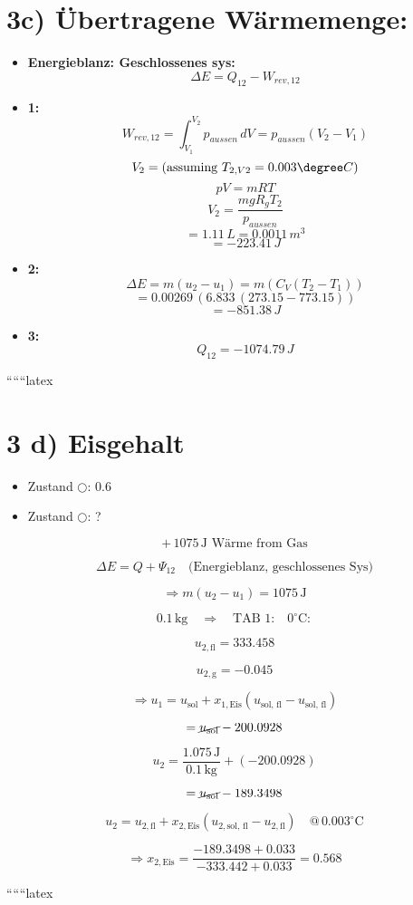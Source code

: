 \section*{3c) Übertragene Wärmemenge:}

\begin{itemize}
    \item \textbf{Energieblanz: Geschlossenes sys:}
    \[
    \Delta E = Q_{12} - W_{rev, 12}
    \]
    \item \textbf{1:}
    \[
    W_{rev, 12} = \int_{V_1}^{V_2} p_{aussen} \, dV = p_{aussen} (V_2 - V_1)
    \]
    \[
    V_2 = \left(\text{assuming } T_{2, V2} = 0.003 \degree C\right)
    \]
    \[
    pV = mRT
    \]
    \[
    V_2 = \frac{m g R_{g} T_{2}}{p_{aussen}}
    \]
    \[
    = 1.11 \, L = 0.0011 \, m^3
    \]
    \[
    = -223.41 \, J
    \]
    \item \textbf{2:}
    \[
    \Delta E = m (u_2 - u_1) = m (C_V (T_2 - T_1))
    \]
    \[
    = 0.00269 \, (6.833 \, (273.15 - 773.15))
    \]
    \[
    = -851.38 \, J
    \]
    \item \textbf{3:}
    \[
    Q_{12} = -1074.79 \, J
    \]
\end{itemize}

``````latex


\section*{3 d) Eisgehalt}

\begin{itemize}
    \item Zustand \(\bigcirc\): 0.6
    \item Zustand \(\bigcirc\): ?
\end{itemize}

\[
+ \, 1075 \, \text{J Wärme from Gas}
\]

\[
\Delta E = Q + \Psi_{12} \quad \text{(Energieblanz, geschlossenes Sys)}
\]

\[
\Rightarrow m(u_2 - u_1) = 1075 \, \text{J}
\]

\[
0.1 \, \text{kg} \quad \Rightarrow \quad \text{TAB 1:} \quad 0^\circ \text{C}:
\]

\[
u_{2, \text{fl}} = 333.458
\]

\[
u_{2, \text{g}} = -0.045
\]

\[
\Rightarrow u_1 = u_{\text{sol}} + x_{1, \text{Eis}} (u_{\text{sol, fl}} - u_{\text{sol, fl}})
\]

\[
= \cancel{u_{\text{sol}}} - 200.0928
\]

\[
u_2 = \frac{1.075 \, \text{J}}{0.1 \, \text{kg}} + (-200.0928)
\]

\[
= \cancel{u_{\text{sol}}} - 189.3498
\]

\[
u_2 = u_{2, \text{fl}} + x_{2, \text{Eis}} (u_{2, \text{sol, fl}} - u_{2, \text{fl}}) \quad @ \, 0.003^\circ \text{C}
\]

\[
\Rightarrow x_{2, \text{Eis}} = \frac{-189.3498 + 0.033}{-333.442 + 0.033} = 0.568
\]

``````latex


